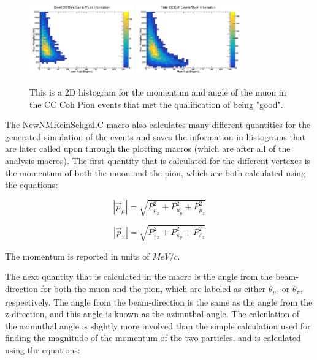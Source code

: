 \documentclass[11pt]{article}
\begin{document}
\begin{figure}[H]
\centering
\includegraphics[width=0.4\textwidth]{NewNMReinSehgalImages/7.png}
\includegraphics[width=0.4\textwidth]{NewNMReinSehgalImages/8.png}
\caption{This is a 2D histogram for the momentum and angle of the muon in the CC Coh Pion events that met the qualification of being "good".}
\end{figure}

The NewNMReinSehgal.C macro also calculates many different quantities for the generated simulation of the events and saves the information in histograms that are later called upon through the plotting macros (which are after all of the analysis macros). The first quantity that is calculated for the different vertexes is the momentum of both the muon and the pion, which are both calculated using the equations:

\begin{equation}
|\vec{p}_\mu| = \sqrt{P_{\mu_x}^2 + P_{\mu_y}^2 + P_{\mu_z}^2}
\end{equation}

\begin{equation}
|\vec{p}_\pi| = \sqrt{P_{\pi_x}^2 + P_{\pi_y}^2 + P_{\pi_z}^2}
\end{equation}

\noindent
The momentum is reported in units of $MeV/c$.

The next quantity that is calculated in the macro is the angle from the beam-direction for both the muon and the pion, which are labeled as either $\theta_\mu$, or $\theta_\pi$, respectively. The angle from the beam-direction is the same as the angle from the z-direction, and this angle is known as the azimuthal angle. The calculation of the azimuthal angle is slightly more involved than the simple calculation used for finding the magnitude of the momentum of the two particles, and is calculated using the equations:
\end{document}

